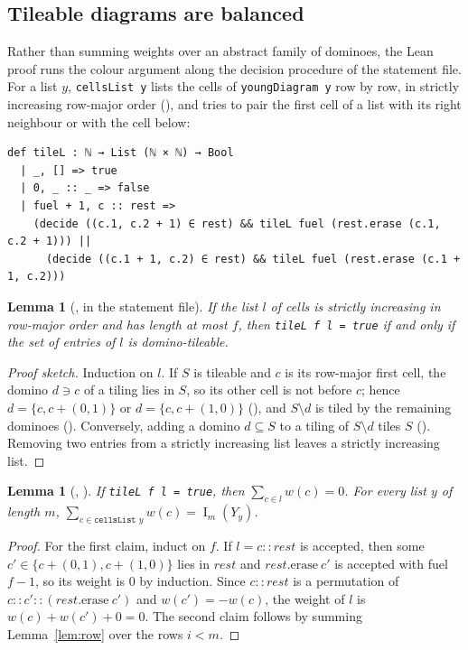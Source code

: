 \documentclass[11pt]{amsart}
\theoremstyle{plain}
\newtheorem{lemma}[theorem]{Lemma}
\theoremstyle{definition}
\newcommand{\imb}{\operatorname{I}}
\begin{document}
\subsection{Tileable diagrams are balanced}\label{sec:fwd}
Rather than summing weights over an abstract family of dominoes, the Lean proof runs the colour argument along the decision procedure of the statement file. For a list $y$, \texttt{cellsList y} lists the cells of \texttt{youngDiagram y} row by row, in strictly increasing row-major order (), and  tries to pair the first cell of a list with its right neighbour or with the cell below:
\begin{lstlisting}
def tileL : ℕ → List (ℕ × ℕ) → Bool
  | _, [] => true
  | 0, _ :: _ => false
  | fuel + 1, c :: rest =>
    (decide ((c.1, c.2 + 1) ∈ rest) && tileL fuel (rest.erase (c.1, c.2 + 1))) ||
      (decide ((c.1 + 1, c.2) ∈ rest) && tileL fuel (rest.erase (c.1 + 1, c.2)))
\end{lstlisting}

\begin{lemma}[, in the statement file]\label{lem:search}
If the list $l$ of cells is strictly increasing in row-major order and has length at most $f$, then \texttt{tileL f l = true} if and only if the set of entries of $l$ is domino-tileable.
\end{lemma}

\begin{proof}[Proof sketch]
Induction on $l$. If $S$ is tileable and $c$ is its row-major first cell, the domino $d\ni c$ of a tiling lies in $S$, so its other cell is not before $c$; hence $d=\{c,c+(0,1)\}$ or $d=\{c,c+(1,0)\}$ (), and $S\setminus d$ is tiled by the remaining dominoes (). Conversely, adding a domino $d\subseteq S$ to a tiling of $S\setminus d$ tiles $S$ (). Removing two entries from a strictly increasing list leaves a strictly increasing list.
\end{proof}

\begin{lemma}[, ]\label{lem:fwd}
If \texttt{tileL f l = true}, then $\sum_{c\in l}w(c)=0$. For every list $y$ of length $m$, $\sum_{c\in\texttt{cellsList }y}w(c)=\imb_m(Y_y)$.
\end{lemma}

\begin{proof}
For the first claim, induct on $f$. If $l=c::\mathit{rest}$ is accepted, then some $c'\in\{c+(0,1),c+(1,0)\}$ lies in $\mathit{rest}$ and $\mathit{rest}.\mathrm{erase}\ c'$ is accepted with fuel $f-1$, so its weight is $0$ by induction. Since $c::\mathit{rest}$ is a permutation of $c::c'::(\mathit{rest}.\mathrm{erase}\ c')$ and $w(c')=-w(c)$, the weight of $l$ is $w(c)+w(c')+0=0$. The second claim follows by summing Lemma~\ref{lem:row} over the rows $i<m$.
\end{proof}
\end{document}
